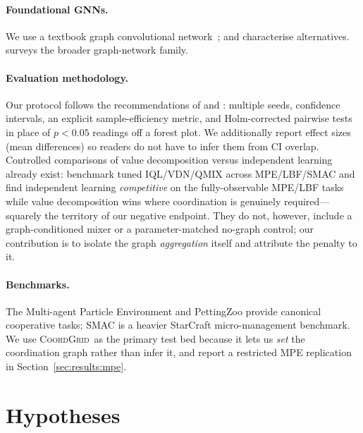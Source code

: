 \documentclass[manuscript, screen, review]{jair}
\providecommand{\citep}{\parencite}
\newcommand{\algoname}[1]{\textsc{#1}}
\newcommand{\coordgrid}{\textsc{CoordGrid}}
\begin{document}
\paragraph{Foundational GNNs.} We use a textbook graph convolutional
network~\citep{kipf_2017_gcn}; \citet{velickovic_2018_gat} and
\citet{xu_2019_gin} characterise alternatives.
\citet{battaglia_2018_gn} surveys the broader graph-network family.

\paragraph{Evaluation methodology.} Our protocol follows the recommendations
of \citet{henderson_2018_drlmatters} and \citet{agarwal_2021_precipice}:
multiple seeds, confidence intervals, an explicit sample-efficiency metric,
and Holm-corrected pairwise tests in place of $p<0.05$ readings off a
forest plot. We additionally report effect sizes (mean differences) so
readers do not have to infer them from CI overlap. Controlled comparisons of
value decomposition versus independent learning already exist:
\citet{papoudakis_2021_benchmarking} benchmark tuned IQL/VDN/QMIX across
MPE/LBF/SMAC and find independent learning \emph{competitive} on the
fully-observable MPE/LBF tasks while value decomposition wins where
coordination is genuinely required---squarely the territory of our negative
endpoint. They do not, however, include a graph-conditioned mixer or a
parameter-matched no-graph control; our contribution is to isolate the graph
\emph{aggregation} itself and attribute the penalty to it.

\paragraph{Benchmarks.} The Multi-agent Particle Environment
\citep{lowe_2017_maddpg} and PettingZoo \citep{terry_2021_pettingzoo}
provide canonical cooperative tasks; \algoname{SMAC}
\citep{samvelyan_2019_smac} is a heavier StarCraft micro-management
benchmark. We use \coordgrid\ as the primary test bed because it lets us
\emph{set} the coordination graph rather than infer it, and report a
restricted MPE replication in Section~\ref{sec:results:mpe}.

\section{Hypotheses}
\label{sec:hypotheses}
\end{document}
